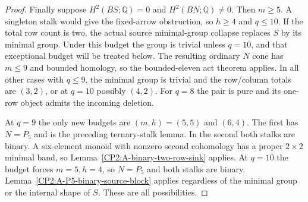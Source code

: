 \begin{proof}
Finally suppose $H^2(BS;\mathbb Q)=0$ and
$H^2(BN;\mathbb Q)\ne0$. Then $m\ge5$. A singleton stalk
would give the fixed-arrow obstruction, so $h\ge4$ and $q\le10$.
If the total row count is two, the actual source minimal-group
collapse replaces $S$ by its minimal group. Under this budget
the group is trivial unless $q=10$, and that exceptional budget
will be treated below. The resulting ordinary $N$ cone has
$m\le9$ and bounded homology, so the bounded-eleven act theorem
applies. In all other cases with $q\le9$, the minimal group is
trivial and the row/column totals are $(3,2)$, or at $q=10$
possibly $(4,2)$. For $q=8$ the pair is pure and its one-row
object admits the incoming deletion.

At $q=9$ the only new budgets are $(m,h)=(5,5)$ and $(6,4)$.
The first has $N=P_5$ and is the preceding ternary-stalk lemma.
In the second both stalks are binary. A six-element monoid with
nonzero second cohomology has a proper $2\times2$ minimal band,
so Lemma~\ref{CP2:A-binary-two-row-sink} applies. At $q=10$
the budget forces $m=5,h=4$, so $N=P_5$ and both stalks are
binary. Lemma~\ref{CP2:A-P5-binary-source-block} applies
regardless of the minimal group or the internal shape of $S$.
These are all possibilities.
\end{proof}
